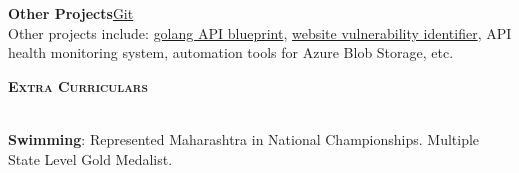 \documentclass[a4paper]{article}
\newcommand{\lineunder} {
\vspace*{-8pt} \\
\hspace*{-18pt} \hrulefill \\
}
\newcommand{\header}[1]{%
{\hspace*{-18pt}\vspace*{6pt} \textsc{\textbf{\Large{#1}}}}%
\vspace*{-6pt} \lineunder
}
\begin{document}

{\textbf{Other Projects}\hfill \href{https://github.com/swarnimcodes/}{Git}} \\
Other projects include: 
\href{https://github.com/swarnimcodes/apigo}{golang API blueprint},
\href{https://github.com/swarnimcodes/website-security-checker}{website vulnerability identifier},
API health monitoring system, 
automation tools for Azure Blob Storage, etc.
\vspace{2mm}


\vspace{2mm}
\header{Extra Curriculars}
\vspace{1mm}

\textbf{Swimming}: Represented Maharashtra in National Championships. Multiple State Level Gold Medalist.
\end{document}
